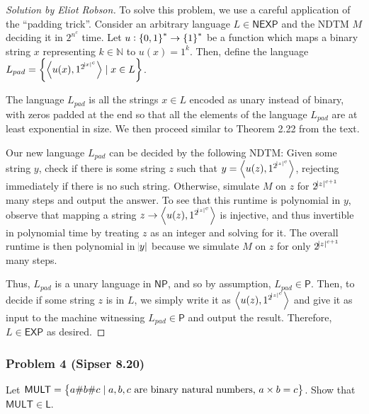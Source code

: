 \documentclass{article}
\newenvironment{solution}[1]{\begin{proof}[Solution by #1]}{\end{proof}}
\newcommand{\inp}[1]{\left\langle #1 \right\rangle} %
\newcommand{\EXP}{\mathsf{EXP}}
\newcommand{\NP}{\mathsf{NP}}
\newcommand{\Pe}{\mathsf{P}}
\newcommand{\NEXP}{\mathsf{NEXP}}
\newcommand{\MULT}{\mathsf{MULT}}
\newcommand{\Le}{\mathsf{L}}
\newcommand{\Naturals}{\mathbb{N}}
\begin{document}
\begin{solution}{Eliot Robson}
    To solve this problem, we use a careful application of the ``padding trick''. Consider an arbitrary language \(L \in \NEXP\) and the NDTM \(M\) deciding it in \(2^{n^c}\) time. Let \(u : \set{0,1}^* \to \set{1}^*\) be a function which maps a binary string \(x\) representing \(k \in \Naturals\) to \(u(x) = 1^k\). Then, define the language \(L_{pad} = \set{\inp{u(x), 1^{2^{\abs{x}^c}}} \mid x \in L}\).
    
    The language \(L_{pad}\) is all the strings \(x \in L\) encoded as unary instead of binary, with zeros padded at the end so that all the elements of the language \(L_{pad}\) are at least exponential in size. We then proceed similar to Theorem 2.22 from the text.
    
    Our new language \(L_{pad}\) can be decided by the following NDTM: Given some string \(y\), check if there is some string \(z\) such that \(y = \inp{u(z), 1^{2^{\abs{z}^c}}}\), rejecting immediately if there is no such string. Otherwise, simulate \(M\) on \(z\) for \(2^{\abs{z}^{c+1}}\) many steps and output the answer. To see that this runtime is polynomial in \(y\), observe that mapping a string \(z \to \inp{u(z), 1^{2^{\abs{z}^c}}}\) is injective, and thus invertible in polynomial time by treating \(z\) as an integer and solving for it. The overall runtime is then polynomial in \(\abs{y}\) because we simulate \(M\) on \(z\) for only \(2^{\abs{z}^{c+1}}\) many steps.    
    
    Thus, \(L_{pad}\) is a unary language in \(\NP\), and so by assumption, \(L_{pad} \in \Pe\). Then, to decide if some string \(z\) is in \(L\), we simply write it as \(\inp{u(z), 1^{2^{\abs{z}^c}}}\) and give it as input to the machine witnessing \(L_{pad} \in \Pe\) and output the result. Therefore, \(L \in \EXP\) as desired.
\end{solution}

\subsubsection{Problem 4 (Sipser 8.20)}
Let \(\MULT = \set{a \# b \# c \mid a,b,c \text{ are binary natural numbers, } a \times b = c}\). Show that \(\MULT \in \Le\).
\end{document}
